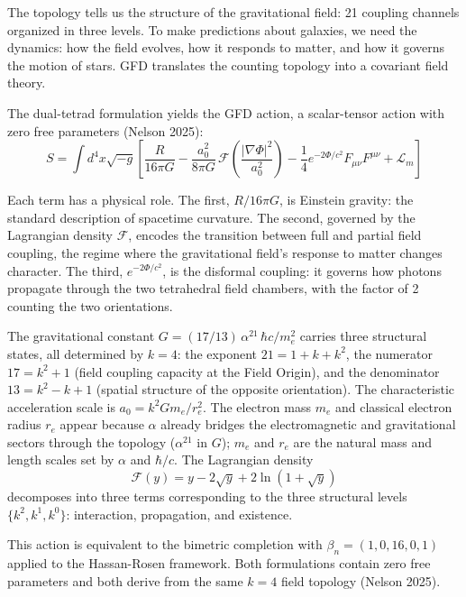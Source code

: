 \documentclass[aps,prd,preprint,superscriptaddress,showpacs,preprintnumbers,amsmath,amssymb,nofootinbib]{revtex4-2}
\begin{document}
The topology tells us the structure of the gravitational field: 21 coupling channels organized in three levels. To make predictions about galaxies, we need the dynamics: how the field evolves, how it responds to matter, and how it governs the motion of stars. GFD translates the counting topology into a covariant field theory.

The dual-tetrad formulation yields the GFD action, a scalar-tensor action with zero free parameters (Nelson 2025):
\begin{equation}
S = \int d^4x \sqrt{-g} \left[ \frac{R}{16\pi G} - \frac{a_0^2}{8\pi G}\,\mathcal{F}\!\left(\frac{|\nabla\Phi|^2}{a_0^2}\right) - \frac{1}{4}e^{-2\Phi/c^2} F_{\mu\nu}F^{\mu\nu} + \mathcal{L}_m \right]
\label{eq:action}
\end{equation}

Each term has a physical role. The first, $R/16\pi G$, is Einstein gravity: the standard description of spacetime curvature. The second, governed by the Lagrangian density $\mathcal{F}$, encodes the transition between full and partial field coupling, the regime where the gravitational field's response to matter changes character. The third, $e^{-2\Phi/c^2}$, is the disformal coupling: it governs how photons propagate through the two tetrahedral field chambers, with the factor of 2 counting the two orientations.

The gravitational constant $G = (17/13)\,\alpha^{21}\,\hbar c/m_e^2$ carries three structural states, all determined by $k = 4$: the exponent $21 = 1 + k + k^2$, the numerator $17 = k^2 + 1$ (field coupling capacity at the Field Origin), and the denominator $13 = k^2 - k + 1$ (spatial structure of the opposite orientation). The characteristic acceleration scale is $a_0 = k^2 G m_e/r_e^2$. The electron mass $m_e$ and classical electron radius $r_e$ appear because $\alpha$ already bridges the electromagnetic and gravitational sectors through the topology ($\alpha^{21}$ in $G$); $m_e$ and $r_e$ are the natural mass and length scales set by $\alpha$ and $\hbar/c$. The Lagrangian density
\begin{equation}
\mathcal{F}(y) = y - 2\sqrt{y} + 2\ln(1 + \sqrt{y})
\label{eq:lagrangian}
\end{equation}
decomposes into three terms corresponding to the three structural levels $\{k^2, k^1, k^0\}$: interaction, propagation, and existence.

This action is equivalent to the bimetric completion with $\beta_n = (1, 0, 16, 0, 1)$ applied to the Hassan-Rosen framework. Both formulations contain zero free parameters and both derive from the same $k = 4$ field topology (Nelson 2025).
\end{document}
